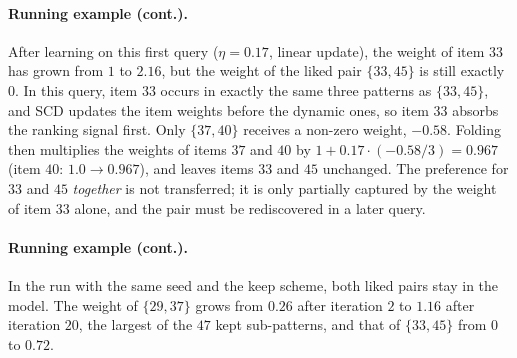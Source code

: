 \paragraph{Running example (cont.).}
After learning on this first query ($\eta = 0.17$, linear update), the weight of item $33$ has grown from $1$ to
$2.16$, but the weight of the liked pair $\{33, 45\}$ is still exactly $0$. In this query, item $33$ occurs in
exactly the same three patterns as $\{33, 45\}$, and SCD updates the item weights before the dynamic ones, so
item $33$ absorbs the ranking signal first. Only $\{37, 40\}$ receives a non-zero
weight, $-0.58$. Folding then multiplies the weights of items $37$ and $40$ by
$1 + 0.17 \cdot (-0.58 / 3) = 0.967$ (item $40$: $1.0 \to 0.967$), and leaves items $33$ and $45$ unchanged.
The preference for $33$ and $45$ \emph{together} is not transferred; it is only partially captured by the
weight of item $33$ alone, and the pair must be rediscovered in a later query.

\paragraph{Running example (cont.).}
In the run with the same seed and the keep scheme, both liked pairs stay in the model. The weight of
$\{29, 37\}$ grows from $0.26$ after iteration $2$ to $1.16$ after iteration $20$, the largest of the $47$ kept
sub-patterns, and that of $\{33, 45\}$ from $0$ to $0.72$.

